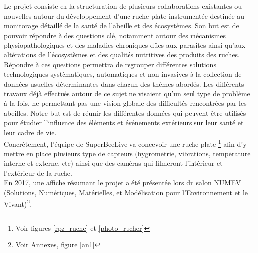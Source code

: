 \documentclass[11pt,french,a4paper]{report}
\begin{document}
Le projet consiste en la structuration de plusieurs collaborations existantes ou nouvelles autour du développement 
d’une ruche plate instrumentée destinée au monitorage détaillé de la santé de l’abeille et des écosystèmes. Son but est de
pouvoir répondre à des questions clé, notamment autour des mécanismes physiopathologiques et des maladies chroniques 
dûes aux parasites ainsi qu’aux altérations de l’écosystèmes et des qualités nutritives des produits des ruches. \\
Répondre à ces questions permettra de regrouper différentes solutions technologiques systèmatiques, 
automatiques et non-invasives à la collection de données usuelles déterminantes dans chacun des thèmes abordés.
Les différents travaux déjà effectués autour de ce sujet ne visaient qu’un seul type de problème à la fois, 
ne permettant pas une vision globale des difficultés rencontrées par les abeilles. Notre but est de réunir les différentes
données qui peuvent être utilisés pour étudier l’influence des éléments et événements extérieurs sur leur santé et leur cadre de vie.\\

Concrètement, l'équipe de SuperBeeLive va concevoir une ruche plate \footnote{Voir figures \ref{rpz_ruche} et \ref{photo_rucher}} afin d'y mettre 
en place plusieurs type  de capteurs (hygrométrie, vibrations, température interne et externe, etc) ainsi que des caméras qui filmeront 
l'intérieur et l'extérieur de la ruche. \\
En 2017, une affiche résumant le projet a été présentée lors du salon NUMEV (Solutions, Numériques, Matérielles, et 
Modélisation pour l'Environnement et le Vivant)\footnote{Voir Annexes, figure \ref{an1} }. \\ 
\end{document}
